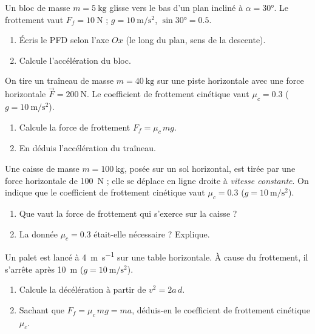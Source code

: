 \documentclass[11pt,a4paper]{article}
\newcommand{\vv}[1]{\vec{#1}}\newcommand{\ds}{\displaystyle}
\begin{document}

\begin{exo}
Un bloc de masse $m=\qty{5}{\kilogram}$ glisse vers le bas d'un plan incliné à $\alpha=\ang{30}$.
Le frottement vaut $F_f=\qty{10}{\newton}$ ; $g=\qty{10}{\metre\per\second\squared}$, $\sin\ang{30}=\num{0,5}$.
\begin{enumerate}[label=\alph*)]
  \item Écris le PFD selon l'axe $Ox$ (le long du plan, sens de la descente).
  \item Calcule l'accélération du bloc.
\end{enumerate}
\end{exo}

\begin{exo}
On tire un traîneau de masse $m=\qty{40}{\kilogram}$ sur une piste horizontale avec une force
horizontale $\vv F=\qty{200}{\newton}$. Le coefficient de frottement cinétique vaut $\mu_c=\num{0,3}$
($g=\qty{10}{\metre\per\second\squared}$).
\begin{enumerate}[label=\alph*)]
  \item Calcule la force de frottement $F_f=\mu_c\, mg$.
  \item En déduis l'accélération du traîneau.
\end{enumerate}
\end{exo}

\begin{exo}
Une caisse de masse $m=\qty{100}{\kilogram}$, posée sur un sol horizontal, est tirée par une force
horizontale de \qty{100}{\newton} ; elle se déplace en ligne droite à \emph{vitesse constante}. On
indique que le coefficient de frottement cinétique vaut $\mu_c=\num{0,3}$ ($g=\qty{10}{\metre\per\second\squared}$).
\begin{enumerate}[label=\alph*)]
  \item Que vaut la force de frottement qui s'exerce sur la caisse ?
  \item La donnée $\mu_c=\num{0,3}$ était-elle nécessaire ? Explique.
\end{enumerate}
\end{exo}

\begin{exo}
Un palet est lancé à \qty{4}{\metre\per\second} sur une table horizontale. À cause du frottement, il
s'arrête après \qty{10}{\metre} ($g=\qty{10}{\metre\per\second\squared}$).
\begin{enumerate}[label=\alph*)]
  \item Calcule la décélération à partir de $v^2=2a\,d$.
  \item Sachant que $F_f=\mu_c\, mg=ma$, déduis-en le coefficient de frottement cinétique $\mu_c$.
\end{enumerate}
\end{exo}
\end{document}
